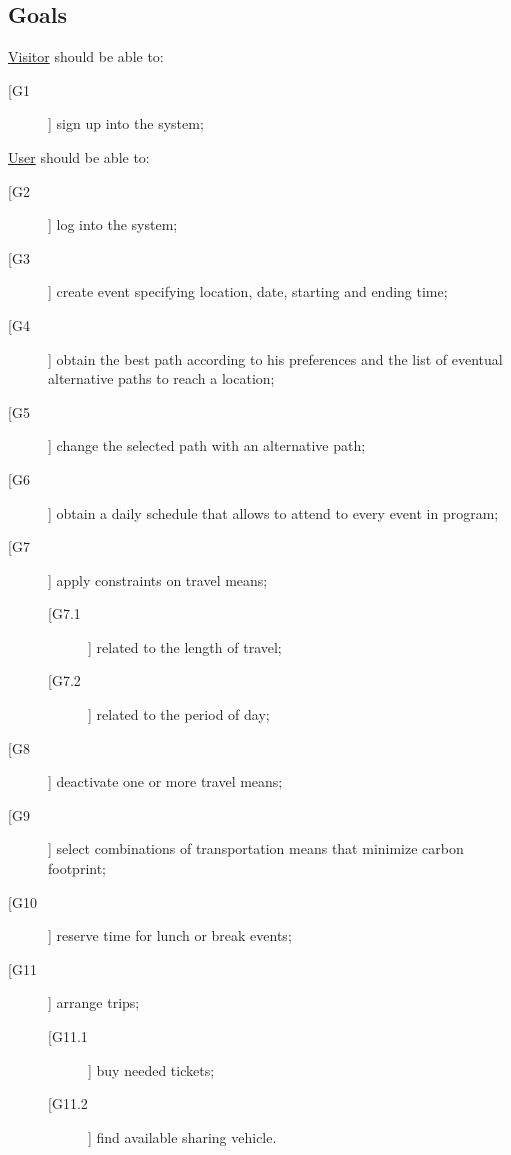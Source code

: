 \subsection{Goals}

\underline{Visitor} should be able to:
\begin{description}
\item [[G1]] sign up into the system;
\end{description}

\noindent\underline{User} should be able to:
\begin{description}
\item[[G2]] log into the system;
\item[[G3]] create event specifying location, date, starting and ending time;
\item[[G4]] obtain the best path according to his preferences and the list of eventual alternative paths to reach a location;
\item[[G5]] change the selected path with an alternative path; 
\item[[G6]] obtain a daily schedule that allows to attend to every event in program;
\item[[G7]] apply constraints on travel means;
	\begin{description}
	\item[[G7.1]] related to the length of travel;
	\item[[G7.2]] related to the period of day;
	\end{description}
\item[[G8]] deactivate one or more travel means;
\item[[G9]] select combinations of transportation means that minimize carbon footprint;
\item[[G10]] reserve time for lunch or break events;
\item[[G11]] arrange trips;
	\begin{description}
	\item[[G11.1]] buy needed tickets;
	\item[[G11.2]] find available sharing vehicle.
	\end{description}
\end{description}
